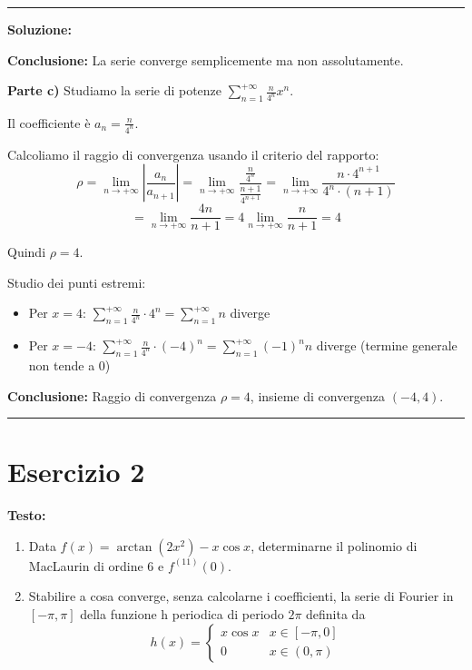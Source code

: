 \documentclass[12pt, a4paper]{article}
\newenvironment{solution}
{\par\noindent\rule{\textwidth}{0.4pt}\par\textbf{Soluzione:}\medskip\par}
{\par\rule{\textwidth}{0.4pt}\par\bigskip}
\begin{document}
\begin{solution}
\textbf{Conclusione:} La serie converge semplicemente ma non assolutamente.

\vspace{0.5cm}

\textbf{Parte c)} Studiamo la serie di potenze $\displaystyle\sum_{n=1}^{+\infty} \frac{n}{4^{n}}x^{n}$.

Il coefficiente è $a_n = \frac{n}{4^n}$.

Calcoliamo il raggio di convergenza usando il criterio del rapporto:
\[
\rho = \lim_{n \to +\infty} \left|\frac{a_n}{a_{n+1}}\right| = \lim_{n \to +\infty} \frac{\frac{n}{4^n}}{\frac{n+1}{4^{n+1}}} = \lim_{n \to +\infty} \frac{n \cdot 4^{n+1}}{4^n \cdot (n+1)}
\]
\[
= \lim_{n \to +\infty} \frac{4n}{n+1} = 4 \lim_{n \to +\infty} \frac{n}{n+1} = 4
\]

Quindi $\rho = 4$.

Studio dei punti estremi:
\begin{itemize}
    \item Per $x = 4$: $\displaystyle\sum_{n=1}^{+\infty} \frac{n}{4^n} \cdot 4^n = \displaystyle\sum_{n=1}^{+\infty} n$ diverge
    \item Per $x = -4$: $\displaystyle\sum_{n=1}^{+\infty} \frac{n}{4^n} \cdot (-4)^n = \displaystyle\sum_{n=1}^{+\infty} (-1)^n n$ diverge (termine generale non tende a 0)
\end{itemize}

\textbf{Conclusione:} Raggio di convergenza $\rho = 4$, insieme di convergenza $(-4, 4)$.
\end{solution}

\newpage

\section*{Esercizio 2}

\textbf{Testo:} 
\begin{enumerate}
    \item Data $f(x) = \arctan(2x^{2}) - x \cos x$, determinarne il polinomio di MacLaurin di ordine 6 e $f^{(11)}(0)$.
    \item Stabilire a cosa converge, senza calcolarne i coefficienti, la serie di Fourier in $[-\pi, \pi]$ della funzione h periodica di periodo $2\pi$ definita da
    \[ h(x) = \begin{cases} x \cos x & x \in [-\pi,0] \\ 0 & x \in (0,\pi) \end{cases} \]
\end{enumerate}
\end{document}
